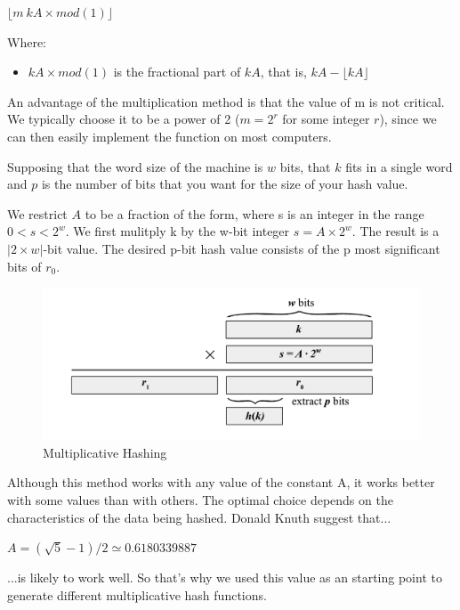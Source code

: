 \documentclass[12pt]{article}
\begin{document}
{\begin{center}
 $ \lfloor m\ kA \times mod(1)  \rfloor$
\end{center}
Where:
\begin{itemize}
\item $kA  \times mod(1)$  is the fractional part of $kA$, that is, $kA- \lfloor kA \rfloor$
\end{itemize}
An advantage of the multiplication method is that the value of m is not critical. We typically choose it to be a power of 2 ($m = 2^r$ for some integer $r$), since we can then easily implement the function on most computers.

\vspace{0.4cm}
Supposing that the word size of the machine is $w$ bits, that $k$ fits in a single word and $p$ is the number of bits that you want for the size of your hash value.

 We restrict $A$ to be a fraction of the form, where s is an integer in the range $0<s<2^w$. We first mulitply k by the w-bit integer $s = A\times 2^w$. The result is a $|2 \times w| $-bit value. The desired p-bit hash value consists of the p most significant bits of $r_0$. 


\begin{figure}[H]
	\centering
	\includegraphics[scale=0.7]{graphs/MultiplicativeHashingDiagram.pdf}
	\caption{Multiplicative Hashing}
	\label{fig:MultiplicativeHashing}
\end{figure}

\bigskip

Although this method works with any value of the constant A, it works better with some values than with others. The optimal choice depends on the characteristics of the data being hashed. Donald Knuth suggest that...

$ A = (\sqrt{5} -1)/2 \simeq 0.6180339887  $

...is likely to work well. So that's why we used this value as an starting point to generate different multiplicative hash functions.
\bigskip

}
\end{document}
